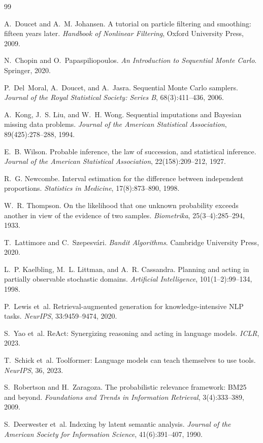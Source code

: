 \documentclass[11pt,a4paper]{article}
\begin{document}
\begin{thebibliography}{99}
\small

 A.~Doucet and A.~M. Johansen.
A tutorial on particle filtering and smoothing: fifteen years later.
\emph{Handbook of Nonlinear Filtering}, Oxford University Press, 2009.

 N.~Chopin and O.~Papaspiliopoulos.
\emph{An Introduction to Sequential Monte Carlo}. Springer, 2020.

 P.~Del~Moral, A.~Doucet, and A.~Jasra.
Sequential Monte Carlo samplers.
\emph{Journal of the Royal Statistical Society: Series B}, 68(3):411--436, 2006.

 A.~Kong, J.~S. Liu, and W.~H. Wong.
Sequential imputations and Bayesian missing data problems.
\emph{Journal of the American Statistical Association}, 89(425):278--288, 1994.

 E.~B. Wilson.
Probable inference, the law of succession, and statistical inference.
\emph{Journal of the American Statistical Association}, 22(158):209--212, 1927.

 R.~G. Newcombe.
Interval estimation for the difference between independent proportions.
\emph{Statistics in Medicine}, 17(8):873--890, 1998.

 W.~R. Thompson.
On the likelihood that one unknown probability exceeds another in view of the
evidence of two samples. \emph{Biometrika}, 25(3--4):285--294, 1933.

 T.~Lattimore and C.~Szepesv\'{a}ri.
\emph{Bandit Algorithms}. Cambridge University Press, 2020.

 L.~P. Kaelbling, M.~L. Littman, and A.~R. Cassandra.
Planning and acting in partially observable stochastic domains.
\emph{Artificial Intelligence}, 101(1--2):99--134, 1998.

 P.~Lewis et~al.
Retrieval-augmented generation for knowledge-intensive NLP tasks.
\emph{NeurIPS}, 33:9459--9474, 2020.

 S.~Yao et~al.
ReAct: Synergizing reasoning and acting in language models. \emph{ICLR}, 2023.

 T.~Schick et~al.
Toolformer: Language models can teach themselves to use tools.
\emph{NeurIPS}, 36, 2023.

 S.~Robertson and H.~Zaragoza.
The probabilistic relevance framework: BM25 and beyond.
\emph{Foundations and Trends in Information Retrieval}, 3(4):333--389, 2009.

 S.~Deerwester et~al.
Indexing by latent semantic analysis.
\emph{Journal of the American Society for Information Science}, 41(6):391--407, 1990.

\end{thebibliography}
\end{document}
